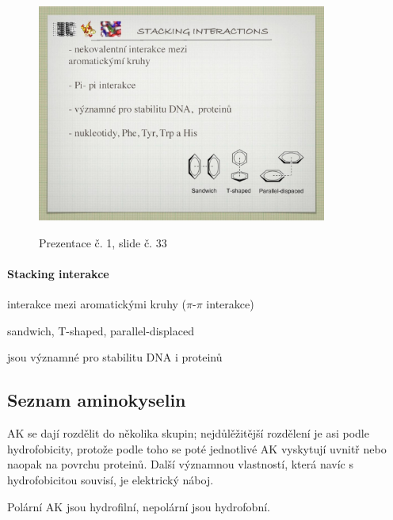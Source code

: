 \documentclass[DIV=8]{scrreprt}
\begin{document}
\begin{figure}
    \caption{Prezentace č. 1, slide č. 33}
    \includegraphics[width=0.85\textwidth]{slides-1/slide-33.jpg}
    \centering
    \label{slides-1-slide-33}
\end{figure}

\paragraph{Stacking interakce}
\begin{myItemize}[nosep]
    \item interakce mezi aromatickými kruhy (\(\pi\)-\(\pi\) interakce)
    \item sandwich, T-shaped, parallel-displaced
    \item jsou významné pro stabilitu DNA i proteinů
\end{myItemize}



\subsection{Seznam aminokyselin} \label{Seznam aminokyselin}


AK se dají rozdělit do několika skupin; nejdůlěžitější rozdělení je asi podle hydrofobicity, protože podle toho se poté jednotlivé AK vyskytují uvnitř nebo naopak na povrchu proteinů. Další významnou vlastností, která navíc s hydrofobicitou souvisí, je elektrický náboj.


Polární AK jsou hydrofilní, nepolární jsou hydrofobní.
\end{document}
